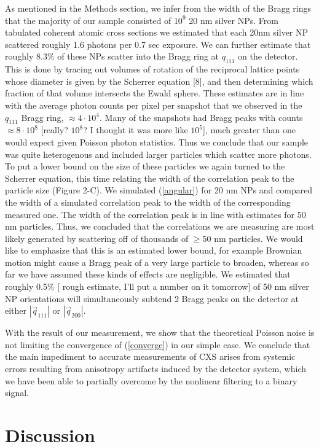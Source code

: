 \documentclass [11pt,fleqn]{article}
\begin{document}
As mentioned in the Methods section, we infer from the width of the Bragg rings that the majority of our sample consisted of $10^9$ 20 nm silver NPs. From tabulated coherent atomic cross sections \cite{Henke:1993wx} we estimated that each 20nm silver NP scattered roughly 1.6 photons per 0.7 sec exposure. We can further estimate that roughly 8.3\% of these NPs scatter into the Bragg ring at $q_{111}$ on the detector. This is done by tracing out volumes of rotation of the reciprocal lattice points whose diameter is given by the Scherrer equation [8], and then determining which fraction of that volume intersects the Ewald sphere. These estimates are in line with the average photon counts per pixel per snapshot that we observed in the $q_{111}$ Bragg ring, $\approx 4 \cdot10^4$. Many of the snapshots had Bragg peaks with counts $\approx 8 \cdot10^8$ [really? $10^8$? I thought it was more like $10^5$], much greater than one would expect given Poisson photon statistics. Thus we conclude that our sample was quite heterogenous and included larger particles which scatter more photons. To put a lower bound on the size of these particles we again turned to the Scherrer equation, this time relating the width of the correlation peak to the particle size (Figure 2-C). We simulated (\ref{angular}) for 20 nm NPs and compared the width of a simulated correlation peak to the width of the corresponding measured one. The width of the correlation peak is in line with estimates for 50 nm particles. Thus, we concluded that the correlations we are measuring are most likely generated by scattering off of thousands of $\ge$50 nm particles. We would like to emphasize that this is an estimated lower bound, for example Brownian motion might cause a Bragg peak of a very large particle to broaden, whereas so far we have assumed these kinds of effects are negligible. We estimated that roughly 0.5\% [ rough estimate, I'll put a number on it tomorrow] of 50 nm silver NP orientations will simultaneously subtend 2 Bragg peaks on the detector at either $|\vec{q}_{111}|$ or $|\vec{q}_{200}|$.

With the result of our measurement, we show that the theoretical Poisson noise is not limiting the convergence of (\ref{converge}) in our simple case. We conclude that the main impediment to accurate measurements of CXS arises from systemic errors resulting from anisotropy artifacts induced by the detector system, which we have been able to partially overcome by the nonlinear filtering to a binary signal.

\section{Discussion}
\end{document}
